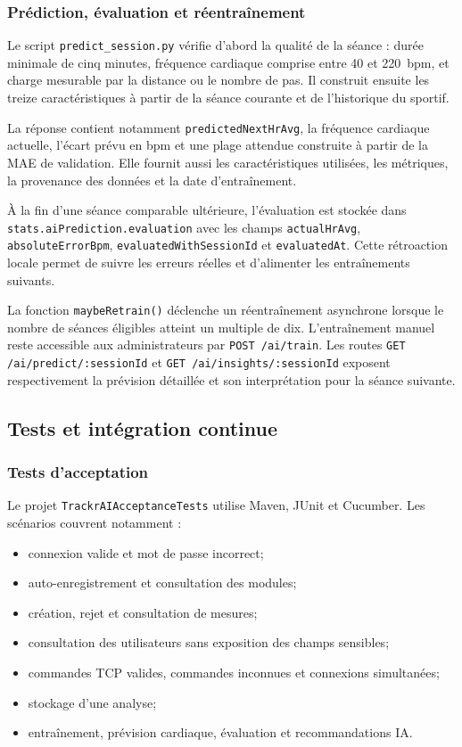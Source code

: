 \documentclass[11pt,a4paper]{article}
\newcommand{\code}[1]{\nolinkurl{#1}}
\begin{document}
\subsubsection{Prédiction, évaluation et réentraînement}

Le script \code{predict_session.py} vérifie d'abord la qualité de la séance : durée minimale de cinq minutes, fréquence cardiaque comprise entre 40 et 220~bpm, et charge mesurable par la distance ou le nombre de pas. Il construit ensuite les treize caractéristiques à partir de la séance courante et de l'historique du sportif.

La réponse contient notamment \code{predictedNextHrAvg}, la fréquence cardiaque actuelle, l'écart prévu en bpm et une plage attendue construite à partir de la MAE de validation. Elle fournit aussi les caractéristiques utilisées, les métriques, la provenance des données et la date d'entraînement.

À la fin d'une séance comparable ultérieure, l'évaluation est stockée dans \code{stats.aiPrediction.evaluation} avec les champs \code{actualHrAvg}, \code{absoluteErrorBpm}, \code{evaluatedWithSessionId} et \code{evaluatedAt}. Cette rétroaction locale permet de suivre les erreurs réelles et d'alimenter les entraînements suivants.

La fonction \code{maybeRetrain()} déclenche un réentraînement asynchrone lorsque le nombre de séances éligibles atteint un multiple de dix. L'entraînement manuel reste accessible aux administrateurs par \code{POST /ai/train}. Les routes \code{GET /ai/predict/:sessionId} et \code{GET /ai/insights/:sessionId} exposent respectivement la prévision détaillée et son interprétation pour la séance suivante.

\subsection{Tests et intégration continue}

\subsubsection{Tests d'acceptation}

Le projet \code{TrackrAIAcceptanceTests} utilise Maven, JUnit et Cucumber. Les scénarios couvrent notamment :

\begin{itemize}
  \item connexion valide et mot de passe incorrect;
  \item auto-enregistrement et consultation des modules;
  \item création, rejet et consultation de mesures;
  \item consultation des utilisateurs sans exposition des champs sensibles;
  \item commandes TCP valides, commandes inconnues et connexions simultanées;
  \item stockage d'une analyse;
  \item entraînement, prévision cardiaque, évaluation et recommandations IA.
\end{itemize}
\end{document}
